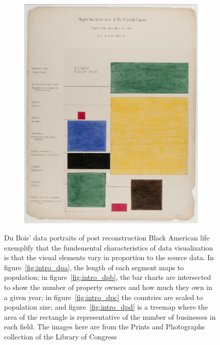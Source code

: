 \documentclass[../main.tex]{subfiles}
\begin{document}
\begin{figure}
\begin{subfigure}{.24\textwidth}
        \includegraphics[width=1\textwidth]{figures/intro/du_bois_heat.png}
        \caption{}
        \label{fig:intro_dbd}
    \end{subfigure}
    \caption{Du Bois' data portraits\cite{duboiscenterattheuniversityofmassachusettsBoisDataPortraits2018} of post reconstruction Black American life exemplify that the fundemental characteristics of data visualization is that the visual elements vary in proportion to the source data. In figure~\ref{fig:intro_dpa}, the length of each segment maps to population; in figure~\ref{fig:intro_dpb}, the bar charts are intersected to show the number of property owners and how much they own in a given year; in figure~\ref{fig:intro_dpc} the countries are scaled to population size; and figure~\ref{fig:intro_dpd} is a treemap where the area of the rectangle is representative of the number of businesses in each field. The images here are from the Prints and Photographs collection of the Library of Congress \cite{duboisGeorgiaNegroCity1900,duboisGeorgiaNegroNegro1900, duboisSeriesStatisticalCharts, duboisSeriesStatisticalChartsa}}
    \label{fig:intro_dubois}
\end{figure}
\end{document}
